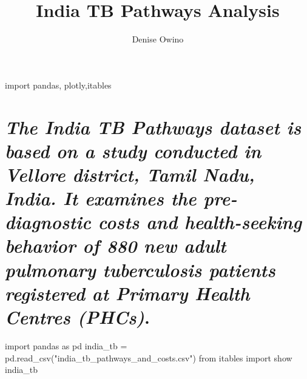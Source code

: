 \documentclass[
  letterpaper,
  DIV=11,
  numbers=noendperiod]{scrartcl}
\title{India TB Pathways Analysis}
\author{Denise Owino}
\date{}
\newenvironment{Shaded}{\begin{snugshade}}{\end{snugshade}}
\newcommand{\ImportTok}[1]{\textcolor[rgb]{0.00,0.46,0.62}{#1}}
\newcommand{\NormalTok}[1]{\textcolor[rgb]{0.00,0.23,0.31}{#1}}
\newcommand{\OperatorTok}[1]{\textcolor[rgb]{0.37,0.37,0.37}{#1}}
\newcommand{\StringTok}[1]{\textcolor[rgb]{0.13,0.47,0.30}{#1}}
\begin{document}
\maketitle


\begin{Shaded}
\begin{Highlighting}[]
\ImportTok{import}\NormalTok{ pandas, plotly,itables}
\end{Highlighting}
\end{Shaded}

\section{\texorpdfstring{\textbf{\emph{The India TB Pathways dataset is
based on a study conducted in Vellore district, Tamil Nadu, India. It
examines the pre-diagnostic costs and health-seeking behavior of 880 new
adult pulmonary tuberculosis patients registered at Primary Health
Centres
(PHCs)}}.}{The India TB Pathways dataset is based on a study conducted in Vellore district, Tamil Nadu, India. It examines the pre-diagnostic costs and health-seeking behavior of 880 new adult pulmonary tuberculosis patients registered at Primary Health Centres (PHCs).}}\label{the-india-tb-pathways-dataset-is-based-on-a-study-conducted-in-vellore-district-tamil-nadu-india.-it-examines-the-pre-diagnostic-costs-and-health-seeking-behavior-of-880-new-adult-pulmonary-tuberculosis-patients-registered-at-primary-health-centres-phcs.}

\begin{Shaded}
\begin{Highlighting}[]
\ImportTok{import}\NormalTok{ pandas }\ImportTok{as}\NormalTok{ pd}
\NormalTok{india\_tb }\OperatorTok{=}\NormalTok{ pd.read\_csv(}\StringTok{"india\_tb\_pathways\_and\_costs.csv"}\NormalTok{)}
\ImportTok{from}\NormalTok{ itables }\ImportTok{import}\NormalTok{ show}
\NormalTok{india\_tb}
\end{Highlighting}
\end{Shaded}
\end{document}
